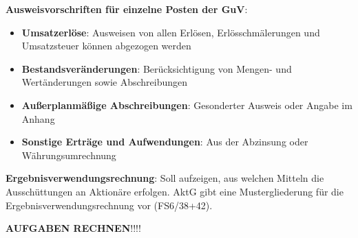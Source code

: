 \textbf{Ausweisvorschriften für einzelne Posten der GuV}:
\begin{itemize}
	\item \textbf{Umsatzerlöse}: Ausweisen von allen Erlösen, Erlösschmälerungen und Umsatzsteuer können abgezogen werden
	\item \textbf{Bestandsveränderungen}: Berücksichtigung von Mengen- und Wertänderungen sowie Abschreibungen
	\item \textbf{Außerplanmäßige Abschreibungen}: Gesonderter Ausweis oder Angabe im Anhang
	\item \textbf{Sonstige Erträge und Aufwendungen}: Aus der Abzinsung oder Währungsumrechnung
\end{itemize}
\bigskip
\textbf{Ergebnisverwendungsrechnung}: Soll aufzeigen, aus welchen Mitteln die Ausschüttungen an Aktionäre erfolgen. AktG gibt eine Mustergliederung für die Ergebnisverwendungsrechnung vor (FS6/38+42).

\textbf{AUFGABEN RECHNEN}!!!!



